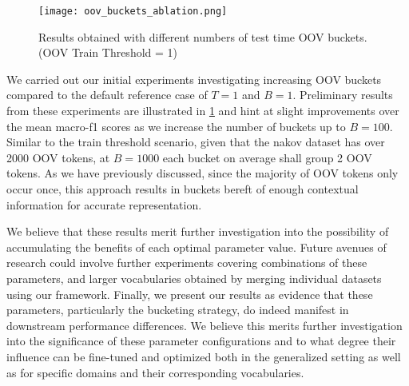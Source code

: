 \documentclass[../../fyp.tex]{subfiles}
\begin{document}
\begin{figure}[!ht]
	\centering
	\texttt{[image: oov\_buckets\_ablation.png]}
	\caption{Results obtained with different numbers of test time OOV buckets. (OOV Train Threshold = 1)}
	\label{fig:oov_buckets_ablation}
\end{figure}

We carried out our initial experiments investigating increasing OOV buckets compared to the default reference case of $T=1$ and $B=1$. Preliminary results from these experiments are illustrated in \ref{fig:oov_buckets_ablation} and hint at slight improvements over the mean macro-f1 scores as we increase the number of buckets up to $B=100$. Similar to the train threshold scenario, given that the nakov dataset has over 2000 OOV tokens, at $B=1000$ each bucket on average shall group 2 OOV tokens. As we have previously discussed, since the majority of OOV tokens only occur once, this approach results in buckets bereft of enough contextual information for accurate representation. 

We believe that these results merit further investigation into the possibility of accumulating the benefits of each optimal parameter value. Future avenues of research could involve further experiments covering combinations of these parameters, and larger vocabularies obtained by merging individual datasets using our framework. Finally, we present our results as evidence that these parameters, particularly the bucketing strategy, do indeed manifest in downstream performance differences. We believe this merits further investigation into the significance of these parameter configurations and to what degree their influence can be fine-tuned and optimized both in the generalized setting as well as for specific domains and their corresponding vocabularies.
\end{document}
